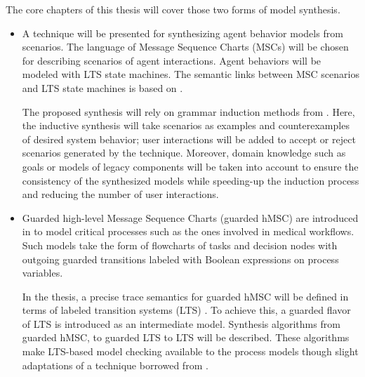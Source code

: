 The core chapters of this thesis will cover those two forms of model synthesis.
\begin{itemize}
\item A technique will be presented for synthesizing agent behavior models from scenarios. The language of Message Sequence Charts (MSCs) will be chosen for describing scenarios of agent interactions. Agent behaviors will be modeled with LTS state machines. The semantic links between MSC scenarios and LTS state machines is based on \cite{Uchitel:2003}.

The proposed synthesis will rely on grammar induction methods from \cite{Oncina:1992, Lang:1998}. Here, the inductive synthesis will take scenarios as examples and counterexamples of desired system behavior; user interactions will be added to accept or reject scenarios generated by the technique. Moreover, domain knowledge such as goals or models of legacy components will be taken into account to ensure the consistency of the synthesized models while speeding-up the induction process and reducing the number of user interactions.

\item Guarded high-level Message Sequence Charts (guarded hMSC) are introduced in \cite{Damas:2010, Damas:2011} to model critical processes such as the ones involved in medical workflows. Such models take the form of flowcharts of tasks and decision nodes with outgoing guarded transitions labeled with Boolean expressions on process variables. 

In the thesis, a precise trace semantics for guarded hMSC will be defined in terms of labeled transition systems (LTS) \cite{Keller:1976, Magee:1999}. To achieve this, a guarded flavor of LTS is introduced as an intermediate model. Synthesis algorithms from guarded hMSC, to guarded LTS to LTS will be described. These algorithms make LTS-based model checking available to the process models though slight adaptations of a technique borrowed from \cite{Giannakopoulou:2003}.
\end{itemize}
